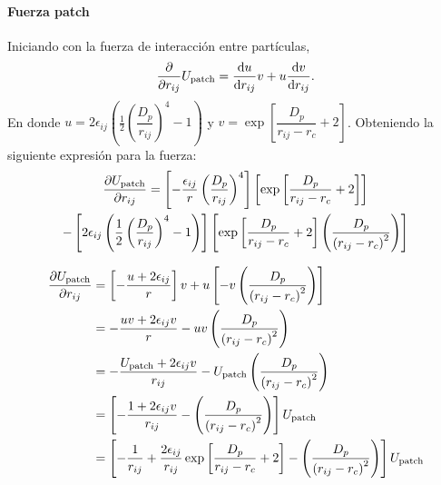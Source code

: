 \documentclass[../main.tex]{subfiles}
\begin{document}
\paragraph{Fuerza patch} Iniciando con la fuerza de interacción entre partículas,
\begin{gather*}
    \pdv{r_{ij}}U_{\mathrm{patch}} = \dv{u}{r_{ij}}v + u\dv{v}{r_{ij}}.
\end{gather*}
En donde \(u = 2\epsilon_{ij}\left( \frac{1}{2}\left(\dfrac{D_p}{r_{ij}}\right)^{4}-1\right)\) y \( v= \exp\left[\dfrac{D_{p}}{r_{ij}-r_{c}}+2\right]\).
Obteniendo la siguiente expresión para la fuerza:
\begin{multline*}
    \pdv{U_{\mathrm{patch}}}{r_{ij}} = 
    \left[-\frac{\epsilon_{ij}}{r}\left(\dfrac{D_p}{r_{ij}}\right)^{4}\right]
    \left[\exp\left[\dfrac{D_{p}}{r_{ij}-r_{c}}+2\right]\right]
    \\
    -
    \left[2\epsilon_{ij}\left( \frac{1}{2}\left(\dfrac{D_p}{r_{ij}}\right)^{4}-1\right)\right]
    \left[\exp\left[\dfrac{D_{p}}{r_{ij}-r_{c}}+2\right]\left(\dfrac{D_{p}}{\qty(r_{ij}-r_{c})^{2}}\right)\right]
\end{multline*}


\begin{align*}
    \pdv{U_{\mathrm{patch}}}{r_{ij}} &= 
    \left[-\dfrac{u+2\epsilon_{ij}}{r}\right]
    v
    +
    u
    \left[-v\left(\dfrac{D_{p}}{\qty(r_{ij}-r_{c})^{2}}\right)\right] \\
    &=
    -\dfrac{uv+2\epsilon_{ij}v}{r}
   - 
    uv\left(\dfrac{D_{p}}{\qty(r_{ij}-r_{c})^{2}}\right) \\
    &=
    -\dfrac{U_{\mathrm{patch}}+2\epsilon_{ij}v}{r_{ij}}
    -
    U_{\mathrm{patch}}\left(\dfrac{D_{p}}{\qty(r_{ij}-r_{c})^{2}}\right) \\
    &=
    \left[
    -\dfrac{1+2\epsilon_{ij}v}{r_{ij}}
    -
    \left(\dfrac{D_{p}}{\qty(r_{ij}-r_{c})^{2}}\right)\right]U_{\mathrm{patch}}\\
    &=
    \left[
    -\dfrac{1}{r_{ij}}+\dfrac{2\epsilon_{ij}}{r_{ij}}\exp\left[\dfrac{D_{p}}{r_{ij}-r_{c}}+2\right]
    -
    \left(\dfrac{D_{p}}{\qty(r_{ij}-r_{c})^{2}}\right)\right]U_{\mathrm{patch}}\\
\end{align*}
\end{document}
